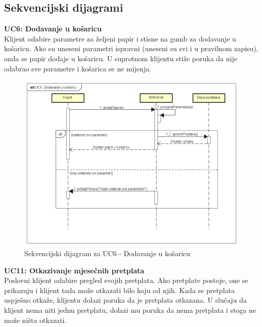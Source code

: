 				\eject		
				
			\subsection{Sekvencijski dijagrami}
				
				\textbf{UC6: Dodavanje u košaricu}\\
				\noindent \normalsize{Klijent odabire parametre za željeni papir i stisne na gumb za dodavanje u košaricu. Ako su uneseni parametri ispravni (uneseni su svi i u pravilnom zapisu), onda se papir dodaje u košaricu. U suprotnom klijentu stiže poruka da nije odabrao sve parametre i košarica se ne mijenja.} \\
				\begin{figure}[H]
					\includegraphics[scale=0.6]{dijagrami/sekv_uc6.PNG} 
					\centering
					\caption{Sekvencijski dijagram za UC6 - Dodavanje u košaricu}
					\label{fig:sekv_uc6}%
				\end{figure}
			\textbf{UC11: Otkazivanje mjesečnih pretplata}\\
			\noindent \normalsize{Poslovni klijent odabire pregled svojih pretplata. Ako pretplate postoje, one se prikazuju i klijent tada može otkazati bilo koju od njih. Kada se pretplata uspješno otkaže, klijentu dolazi poruka da je pretplata otkazana. U slučaju da klijent nema niti jednu pretplatu, dolazi mu poruka da nema pretplata i stoga ne može ništa otkazati.} \\
